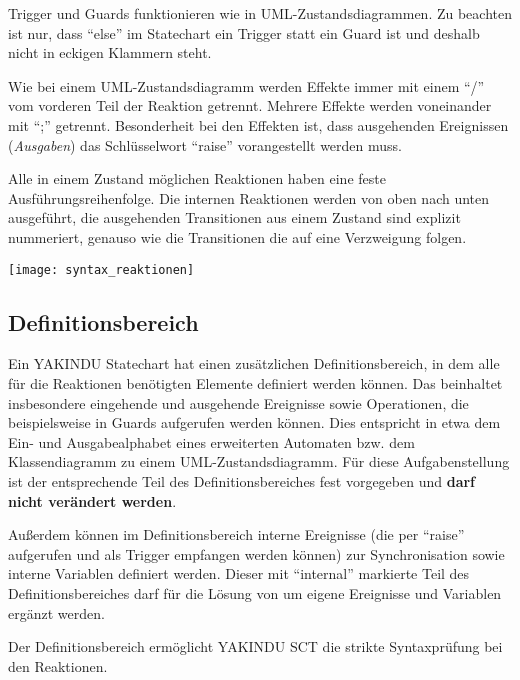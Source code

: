 Trigger und Guards funktionieren wie in UML-Zustandsdiagrammen.
Zu beachten ist nur, dass \enquote{else} im Statechart ein Trigger statt ein Guard ist und deshalb nicht in eckigen Klammern steht.

Wie bei einem UML-Zustandsdiagramm werden Effekte immer mit einem \enquote{/} vom vorderen Teil der Reaktion getrennt. Mehrere Effekte werden voneinander mit \enquote{;} getrennt.
Besonderheit bei den Effekten ist, dass ausgehenden Ereignissen (\emph{Ausgaben}) das Schlüsselwort \enquote{raise} vorangestellt werden muss.

Alle in einem Zustand möglichen Reaktionen haben eine feste Ausführungsreihenfolge. Die internen Reaktionen werden von oben nach unten ausgeführt, die ausgehenden Transitionen aus einem Zustand sind explizit nummeriert, genauso wie die Transitionen die auf eine Verzweigung folgen.

\begin{center}
	\texttt{[image: syntax\_reaktionen]}
\end{center}



\subsection{Definitionsbereich}

Ein YAKINDU Statechart hat einen zusätzlichen Definitionsbereich, in dem alle für die Reaktionen benötigten Elemente definiert werden können. Das beinhaltet insbesondere eingehende und ausgehende Ereignisse sowie Operationen, die beispielsweise in Guards aufgerufen werden können. 
Dies entspricht in etwa dem Ein- und Ausgabealphabet eines erweiterten Automaten bzw. dem Klassendiagramm zu einem UML-Zustandsdiagramm. Für diese Aufgabenstellung ist der entsprechende Teil des Definitionsbereiches fest vorgegeben und \textbf{darf nicht verändert werden}.

Außerdem können im Definitionsbereich interne Ereignisse (die per \enquote{raise} aufgerufen und als Trigger empfangen werden können) zur Synchronisation sowie interne Variablen definiert werden.
Dieser mit \enquote{internal} markierte Teil des Definitionsbereiches darf für die Lösung von \docProjectTitle{} um eigene Ereignisse und Variablen ergänzt werden.

Der Definitionsbereich ermöglicht YAKINDU SCT die strikte Syntaxprüfung bei den Reaktionen.
